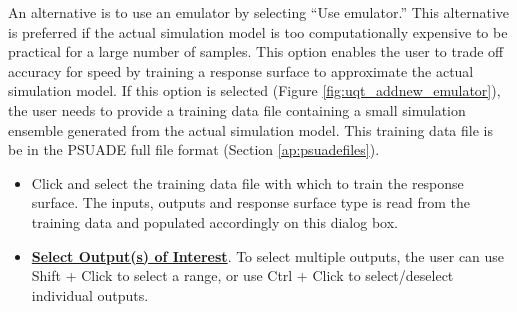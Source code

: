 \begin{enumerate}
	An alternative is to use an emulator by selecting ``Use emulator.'' This
	alternative is preferred if the actual simulation model is too computationally
	expensive to be practical for a large number of samples. This option enables
	the user to trade off accuracy for speed by training a response surface
   to approximate the actual simulation model. If this option is selected 
   (Figure \ref{fig:uqt_addnew_emulator}),
	the user needs to provide a training data file containing a small
   simulation ensemble generated from the
	actual simulation model. This training data file is be in
   the PSUADE full file format (Section \ref{ap:psuadefiles}).
\begin{itemize}
\item{Click  
and select the training data file with which to train the response
surface. The inputs, outputs and response surface type is read from
the training data and populated accordingly on this dialog box.}
\item{\textbf{\underline{Select Output(s) of Interest}}. To select multiple outputs, the user can use
Shift + Click to select a range, or use Ctrl + Click to select/deselect
individual outputs.}
\end{itemize}


\end{enumerate}
